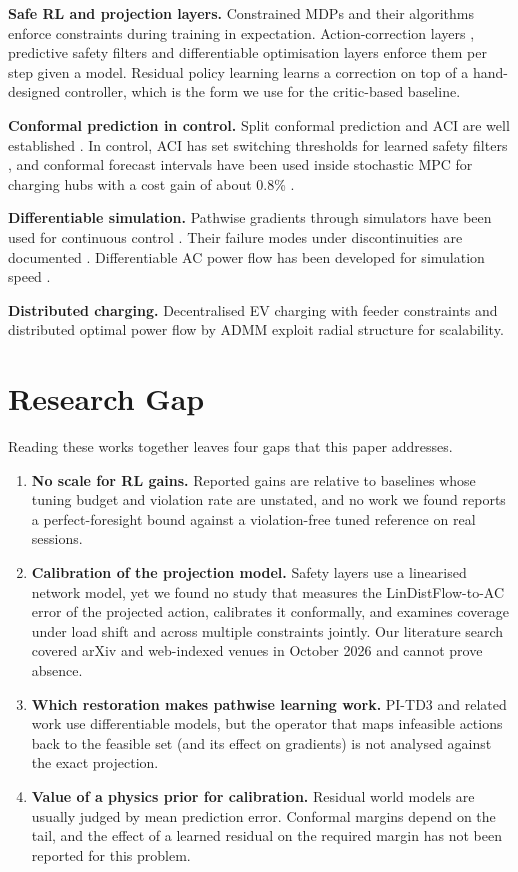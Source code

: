 \documentclass[11pt]{article}
\begin{document}
\textbf{Safe RL and projection layers.} Constrained MDPs and their algorithms \cite{garcia,achiam} enforce constraints during training in expectation. Action-correction layers \cite{dalal}, predictive safety filters \cite{wabersich} and differentiable optimisation layers \cite{optnet,cvxpylayers} enforce them per step given a model. Residual policy learning \cite{johannink,silverres} learns a correction on top of a hand-designed controller, which is the form we use for the critic-based baseline.

\textbf{Conformal prediction in control.} Split conformal prediction \cite{vovk,lei} and ACI \cite{aci} are well established \cite{angelopoulos}. In control, ACI has set switching thresholds for learned safety filters \cite{acofi}, and conformal forecast intervals have been used inside stochastic MPC for charging hubs with a cost gain of about 0.8\% \cite{zapico}.

\textbf{Differentiable simulation.} Pathwise gradients through simulators have been used for continuous control \cite{heess,shac,brax,difftaichi}. Their failure modes under discontinuities are documented \cite{suh,metz}. Differentiable AC power flow has been developed for simulation speed \cite{dpf}.

\textbf{Distributed charging.} Decentralised EV charging with feeder constraints \cite{distev} and distributed optimal power flow by ADMM \cite{boyd} exploit radial structure for scalability.

\section{Research Gap}
Reading these works together leaves four gaps that this paper addresses.
\begin{enumerate}
\item \textbf{No scale for RL gains.} Reported gains are relative to baselines whose tuning budget and violation rate are unstated, and no work we found reports a perfect-foresight bound against a violation-free tuned reference on real sessions.
\item \textbf{Calibration of the projection model.} Safety layers use a linearised network model, yet we found no study that measures the LinDistFlow-to-AC error of the projected action, calibrates it conformally, and examines coverage under load shift and across multiple constraints jointly. Our literature search covered arXiv and web-indexed venues in October 2026 and cannot prove absence.
\item \textbf{Which restoration makes pathwise learning work.} PI-TD3 and related work use differentiable models, but the operator that maps infeasible actions back to the feasible set (and its effect on gradients) is not analysed against the exact projection.
\item \textbf{Value of a physics prior for calibration.} Residual world models are usually judged by mean prediction error. Conformal margins depend on the tail, and the effect of a learned residual on the required margin has not been reported for this problem.
\end{enumerate}
\end{document}
